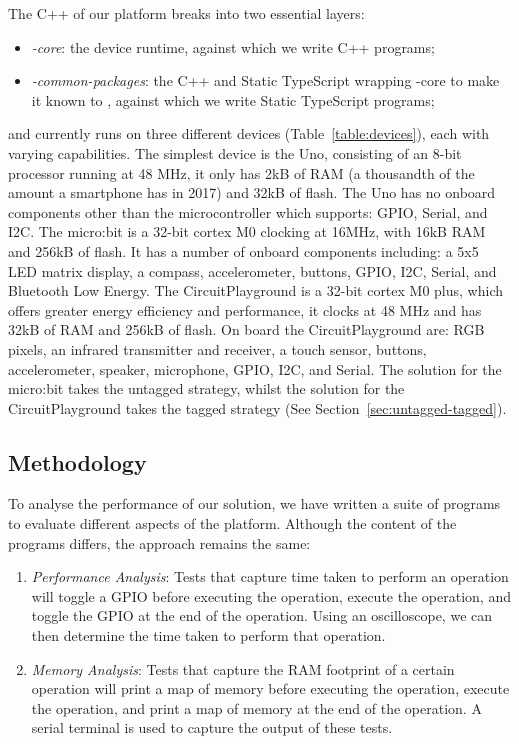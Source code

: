 The C++ of our platform breaks into two essential layers:
\begin{itemize}
\item \emph{\CON-core}: the \CO device runtime, against which we write C++ programs;
\item \emph{\MCN-common-packages}: the C++ and Static TypeScript wrapping \CON-core
to make it known to \MC, against which we write Static TypeScript programs;
\end{itemize}
\MC and \CO currently runs on three different devices (Table~\ref{table:devices}), each with varying capabilities. The simplest device is the Uno, consisting of an 8-bit processor running at 48 MHz, it only has 2kB of RAM (a thousandth of the amount a smartphone has in 2017) and 32kB of flash. The Uno has no onboard components other than the microcontroller which supports: GPIO, Serial, and I2C. The micro:bit is a 32-bit cortex M0 clocking at 16MHz, with 16kB RAM and 256kB of flash. It has a number of onboard components including: a 5x5 LED matrix display, a compass, accelerometer, buttons, GPIO, I2C, Serial, and Bluetooth Low Energy. The CircuitPlayground is a 32-bit cortex M0 plus, which offers greater energy efficiency and performance, it clocks at 48 MHz and has 32kB of RAM and 256kB of flash. On board the CircuitPlayground are: RGB pixels, an infrared transmitter and receiver, a touch sensor, buttons, accelerometer, speaker, microphone, GPIO, I2C, and Serial. The solution for the micro:bit takes the untagged strategy, whilst the solution for the CircuitPlayground takes the tagged strategy (See Section~\ref{sec:untagged-tagged}).

\subsection{Methodology}

To analyse the performance of our solution, we have written a suite of programs to evaluate different aspects of the platform. Although the content of the programs differs, the approach remains the same:

\begin{enumerate}
    \item \textit{Performance Analysis}: Tests that capture time taken to perform an operation will toggle a GPIO before executing the operation, execute the operation, and toggle the GPIO at the end of the operation. Using an oscilloscope, we can then determine the time taken to perform that operation.

    \item \textit{Memory Analysis}: Tests that capture the RAM footprint of a certain operation will print a map of memory before executing the operation, execute the operation, and print a map of memory at the end of the operation. A serial terminal is used to capture the output of these tests.
\end{enumerate}

